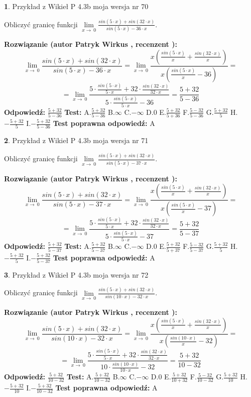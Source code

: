 \documentclass[12pt, a4paper]{article}
\theoremstyle{definition} %
\newtheorem{zad}{}
\newcommand{\zadStart}[1]{\begin{zad}#1\newline}
\newcommand{\zadStop}{\end{zad}}
\newcommand{\rozwStart}[2]{\noindent \textbf{Rozwiązanie (autor #1 , recenzent #2): }\newline}
\newcommand{\rozwStop}{\newline}
\newcommand{\odpStart}{\noindent \textbf{Odpowiedź:}\newline}
\newcommand{\odpStop}{\newline}
\newcommand{\testStart}{\noindent \textbf{Test:}\newline}
\newcommand{\testStop}{\newline}
\newcommand{\kluczStart}{\noindent \textbf{Test poprawna odpowiedź:}\newline}
\newcommand{\kluczStop}{\newline}
\begin{document}
\zadStart{Przykład z Wikieł P 4.3b moja wersja nr 70}


Obliczyć granicę funkcji $\lim\limits_{x\to\ 0}\frac{sin(5 \cdot x)+sin(32 \cdot x)}{sin(5 \cdot x)-36 \cdot x}$.
\zadStop
\rozwStart{Patryk Wirkus}{}
$$\lim\limits_{x\to\ 0}\frac{sin(5 \cdot x)+sin(32 \cdot x)}{sin(5 \cdot x)-36 \cdot x}=\lim\limits_{x\to\ 0}\frac{x(\frac{sin(5 \cdot x)}{x}+\frac{sin(32 \cdot x)}{x})}{x(\frac{sin(5 \cdot x)}{x}-36)}=$$
$$=\lim\limits_{x\to\ 0}\frac{5 \cdot \frac{sin(5 \cdot x)}{5 \cdot x}+32 \cdot \frac{sin(32 \cdot x)}{32 \cdot x}}{5 \cdot \frac{sin(5 \cdot x)}{5 \cdot x}-36}=\frac{5+32}{5-36}$$
\rozwStop
\odpStart
$\frac{5+32}{5-36}$
\odpStop
\testStart
A.$\frac{5+32}{5-36}$
B.$\infty$
C.$-\infty$
D.$0$
E.$\frac{5+32}{5+36}$
F.$\frac{5-32}{5-36}$
G.$\frac{5+32}{5}$
H.$-\frac{5+32}{5}$
I.$-\frac{5+32}{5-36}$
\testStop
\kluczStart
A
\kluczStop



\zadStart{Przykład z Wikieł P 4.3b moja wersja nr 71}


Obliczyć granicę funkcji $\lim\limits_{x\to\ 0}\frac{sin(5 \cdot x)+sin(32 \cdot x)}{sin(5 \cdot x)-37 \cdot x}$.
\zadStop
\rozwStart{Patryk Wirkus}{}
$$\lim\limits_{x\to\ 0}\frac{sin(5 \cdot x)+sin(32 \cdot x)}{sin(5 \cdot x)-37 \cdot x}=\lim\limits_{x\to\ 0}\frac{x(\frac{sin(5 \cdot x)}{x}+\frac{sin(32 \cdot x)}{x})}{x(\frac{sin(5 \cdot x)}{x}-37)}=$$
$$=\lim\limits_{x\to\ 0}\frac{5 \cdot \frac{sin(5 \cdot x)}{5 \cdot x}+32 \cdot \frac{sin(32 \cdot x)}{32 \cdot x}}{5 \cdot \frac{sin(5 \cdot x)}{5 \cdot x}-37}=\frac{5+32}{5-37}$$
\rozwStop
\odpStart
$\frac{5+32}{5-37}$
\odpStop
\testStart
A.$\frac{5+32}{5-37}$
B.$\infty$
C.$-\infty$
D.$0$
E.$\frac{5+32}{5+37}$
F.$\frac{5-32}{5-37}$
G.$\frac{5+32}{5}$
H.$-\frac{5+32}{5}$
I.$-\frac{5+32}{5-37}$
\testStop
\kluczStart
A
\kluczStop



\zadStart{Przykład z Wikieł P 4.3b moja wersja nr 72}


Obliczyć granicę funkcji $\lim\limits_{x\to\ 0}\frac{sin(5 \cdot x)+sin(32 \cdot x)}{sin(10 \cdot x)-32 \cdot x}$.
\zadStop
\rozwStart{Patryk Wirkus}{}
$$\lim\limits_{x\to\ 0}\frac{sin(5 \cdot x)+sin(32 \cdot x)}{sin(10 \cdot x)-32 \cdot x}=\lim\limits_{x\to\ 0}\frac{x(\frac{sin(5 \cdot x)}{x}+\frac{sin(32 \cdot x)}{x})}{x(\frac{sin(10 \cdot x)}{x}-32)}=$$
$$=\lim\limits_{x\to\ 0}\frac{5 \cdot \frac{sin(5 \cdot x)}{5 \cdot x}+32 \cdot \frac{sin(32 \cdot x)}{32 \cdot x}}{10 \cdot \frac{sin(10 \cdot x)}{10 \cdot x}-32}=\frac{5+32}{10-32}$$
\rozwStop
\odpStart
$\frac{5+32}{10-32}$
\odpStop
\testStart
A.$\frac{5+32}{10-32}$
B.$\infty$
C.$-\infty$
D.$0$
E.$\frac{5+32}{10+32}$
F.$\frac{5-32}{10-32}$
G.$\frac{5+32}{10}$
H.$-\frac{5+32}{10}$
I.$-\frac{5+32}{10-32}$
\testStop
\kluczStart
A
\kluczStop
\end{document}
